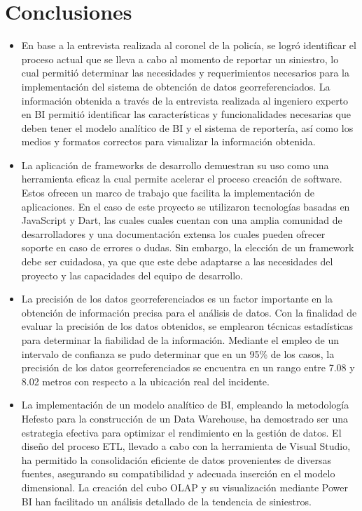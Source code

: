 \section{Conclusiones}
\begin{itemize}
    \item En base a la entrevista realizada al coronel de la policía, se logró identificar el proceso actual que se lleva
          a cabo al momento de reportar un siniestro, lo cual permitió determinar las necesidades y requerimientos necesarios
          para la implementación del sistema de obtención de datos georreferenciados. La información obtenida a través de la
          entrevista realizada al ingeniero experto en BI permitió identificar las características y funcionalidades necesarias
          que deben tener el modelo analítico de BI y el sistema de reportería, así como los medios y formatos correctos para
          visualizar la información obtenida.

    \item La aplicación de frameworks de desarrollo demuestran su uso como una herramienta eficaz la cual permite
          acelerar el proceso creación de software. Estos ofrecen un marco de trabajo que facilita la implementación de
          aplicaciones. En el caso de este proyecto se utilizaron tecnologías basadas en JavaScript y Dart, las cuales
          cuales cuentan con una amplia comunidad de desarrolladores y una documentación extensa los cuales pueden
          ofrecer soporte en caso de errores o dudas. Sin embargo, la elección de un framework debe ser cuidadosa, ya que
          que este debe adaptarse a las necesidades del proyecto y las capacidades del equipo de desarrollo.

    \item La precisión de los datos georreferenciados es un factor importante en la obtención de información precisa
          para el análisis de datos. Con la finalidad de evaluar la precisión de los datos obtenidos, se emplearon técnicas
          estadísticas para determinar la fiabilidad de la información. Mediante el empleo de un intervalo de confianza
          se pudo determinar que en un 95\% de los casos, la precisión de los datos georreferenciados se encuentra en un
          rango entre 7.08 y 8.02 metros con respecto a la ubicación real del incidente.

    \item La implementación de un modelo analítico de BI, empleando la metodología Hefesto para la construcción de un Data
          Warehouse, ha demostrado ser una estrategia efectiva para optimizar el rendimiento en la gestión de datos. El
          diseño del proceso ETL, llevado a cabo con la herramienta de Visual Studio, ha permitido la consolidación
          eficiente de datos provenientes de diversas fuentes, asegurando su compatibilidad y adecuada inserción en el
          modelo dimensional. La creación del cubo OLAP y su visualización mediante Power BI han facilitado un análisis
          detallado de la tendencia de siniestros.


\end{itemize}
